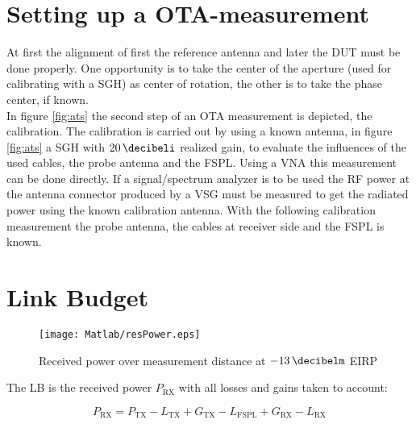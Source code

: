 \section{Setting up a OTA-measurement}

At first the alignment of first the reference antenna and later the \ac{DUT} must be done properly. One opportunity is to take the center of the aperture (used for calibrating with a \ac{SGH}) as center of rotation, the other is to take the phase center, if known.\\
In figure \ref{fig:ats} the second step of an \ac{OTA} measurement is depicted, the calibration. The calibration is carried out by using a known antenna, in figure \ref{fig:ats} a \ac{SGH} with $\SI{20}{\decibeli}$ realized gain, to evaluate the influences of the used cables, the probe antenna and the \ac{FSPL}. Using a \ac{VNA} this measurement can be done directly. If a signal/spectrum analyzer is to be used the \ac{RF} power at the antenna connector produced by a \ac{VSG} must be measured to get the radiated power using the known calibration antenna. With the following calibration measurement the probe antenna, the cables at receiver side and the \ac{FSPL} is known. \cite{ctiaat}

\section{Link Budget}

\begin{figure}[H]
\centering
\texttt{[image: Matlab/resPower.eps]}
\caption{Received power over measurement distance at $\SI{-13}{\decibelm}$ EIRP}
\label{fig:resP}
\end{figure}

The \ac{LB} is the received power $P_{\text{RX}}$ with all losses and gains taken to account:

\begin{equation}
P_{\text{RX}} = P_{\text{TX}}-L_{\text{TX}}+G_{\text{TX}}-L_{\text{FSPL}} + G_{\text{RX}}-L_{\text{RX}}
\end{equation}

